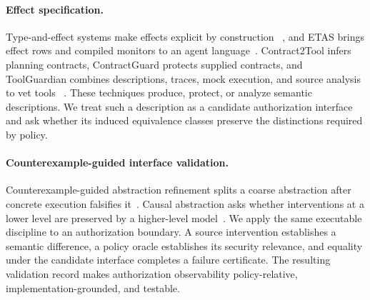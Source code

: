 \paragraph{Effect specification.}
Type-and-effect systems make effects explicit by construction
~\cite{lucassen1988effects}, and ETAS brings effect rows and compiled monitors
to an agent language~\cite{etas2026}. Contract2Tool infers planning contracts,
ContractGuard protects supplied contracts, and ToolGuardian combines
descriptions, traces, mock execution, and source analysis to vet tools
~\cite{contract2tool,contractguard,toolguardian2026}. These techniques produce,
protect, or analyze semantic descriptions. We treat such a description as a
candidate authorization interface and ask whether its induced equivalence
classes preserve the distinctions required by policy.

\paragraph{Counterexample-guided interface validation.}
Counterexample-guided abstraction refinement splits a coarse abstraction after
concrete execution falsifies it~\cite{clarke2000cegar}. Causal abstraction asks
whether interventions at a lower level are preserved by a higher-level
model~\cite{pearl2009causality,beckers2019abstracting,geiger2022inducing}. We
apply the same executable discipline to an authorization boundary. A source
intervention establishes a semantic difference, a policy oracle establishes
its security relevance, and equality under the candidate interface completes a
failure certificate. The resulting validation record makes authorization
observability policy-relative, implementation-grounded, and testable.

